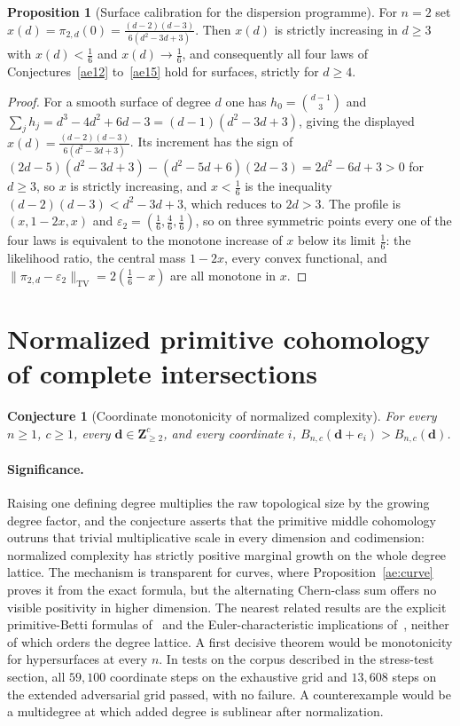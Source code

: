 \documentclass[11pt]{article}
\newtheorem{conjecture}{Conjecture}
\theoremstyle{definition}
\newtheorem{proposition}{Proposition}
\begin{document}
\begin{proposition}[Surface calibration for the dispersion programme]\label{ae:surface}
For $n=2$ set $x(d)=\pi_{2,d}(0)=\frac{(d-2)(d-3)}{6(d^2-3d+3)}$.  Then $x(d)$ is strictly increasing in $d\ge3$ with $x(d)<\tfrac16$ and $x(d)\to\tfrac16$, and consequently all four laws of Conjectures~\ref{ae12} to~\ref{ae15} hold for surfaces, strictly for $d\ge4$.
\end{proposition}

\begin{proof}
For a smooth surface of degree $d$ one has $h_0=\binom{d-1}3$ and $\sum_jh_j=d^3-4d^2+6d-3=(d-1)(d^2-3d+3)$, giving the displayed $x(d)=\frac{(d-2)(d-3)}{6(d^2-3d+3)}$.  Its increment has the sign of $(2d-5)(d^2-3d+3)-(d^2-5d+6)(2d-3)=2d^2-6d+3>0$ for $d\ge3$, so $x$ is strictly increasing, and $x<\tfrac16$ is the inequality $(d-2)(d-3)<d^2-3d+3$, which reduces to $2d>3$.  The profile is $(x,1-2x,x)$ and $\varepsilon_2=(\tfrac16,\tfrac46,\tfrac16)$, so on three symmetric points every one of the four laws is equivalent to the monotone increase of $x$ below its limit $\tfrac16$: the likelihood ratio, the central mass $1-2x$, every convex functional, and $\|\pi_{2,d}-\varepsilon_2\|_{\mathrm{TV}}=2(\tfrac16-x)$ are all monotone in $x$.
\end{proof}

\section{Normalized primitive cohomology of complete intersections}

\begin{conjecture}[Coordinate monotonicity of normalized complexity]\label{ae1}
For every $n\ge1$, $c\ge1$, every $\mathbf d\in\mathbf Z_{\ge2}^c$, and every coordinate $i$, $B_{n,c}(\mathbf d+e_i)>B_{n,c}(\mathbf d)$.
\end{conjecture}

\paragraph{Significance.}
Raising one defining degree multiplies the raw topological size by the growing degree factor, and the conjecture asserts that the primitive middle cohomology outruns that trivial multiplicative scale in every dimension and codimension: normalized complexity has strictly positive marginal growth on the whole degree lattice.  The mechanism is transparent for curves, where Proposition~\ref{ae:curve} proves it from the exact formula, but the alternating Chern-class sum offers no visible positivity in higher dimension.  The nearest related results are the explicit primitive-Betti formulas of~\cite{GL02} and the Euler-characteristic implications of~\cite{CO74}, neither of which orders the degree lattice.  A first decisive theorem would be monotonicity for hypersurfaces at every $n$.  In tests on the corpus described in the stress-test section, all $59{,}100$ coordinate steps on the exhaustive grid and $13{,}608$ steps on the extended adversarial grid passed, with no failure.  A counterexample would be a multidegree at which added degree is sublinear after normalization.
\end{document}
